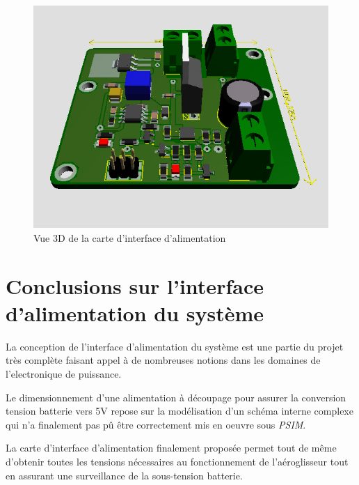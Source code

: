 \begin{landscape}
		\newpage
		
		\begin{figure}
			\begin{center}
				\includegraphics[scale=1.4]{../Illus/supply_gen_3dview.png}
			\end{center}
			\caption{Vue 3D de la carte d'interface d'alimentation}
			\label{supply_gen_3dview}
		\end{figure}
		
		\end{landscape}	 
		
		\newpage
		
	\section{Conclusions sur l'interface d'alimentation du système}
	
	La conception de l'interface d'alimentation du système est une
	partie du projet très complète faisant appel à de nombreuses notions
	dans les domaines de l'electronique de puissance.
	
	Le dimensionnement d'une alimentation à découpage pour assurer
	la conversion tension batterie vers 5V repose sur la modélisation
	d'un schéma interne complexe qui n'a finalement pas pû être
	correctement mis en oeuvre sous \textit{PSIM}.
	
	La carte d'interface d'alimentation finalement proposée permet
	tout de même d'obtenir toutes les tensions nécessaires au fonctionnement
	de l'aéroglisseur tout en assurant une surveillance de la sous-tension
	batterie.